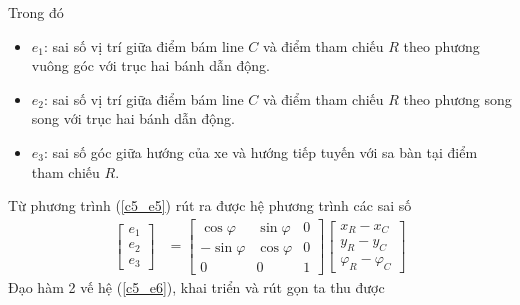           \hspace*{0.6cm}Trong đó
          \begin{itemize}
               \item $e_1$: sai số vị trí giữa điểm bám line $C$ và điểm tham chiếu $R$ theo phương vuông góc với trục hai bánh dẫn động.
               \item $e_2$: sai số vị trí giữa điểm bám line $C$ và điểm tham chiếu $R$ theo phương song song với trục hai bánh dẫn động.
               \item $e_3$: sai số góc giữa hướng của xe và hướng tiếp tuyến với sa bàn tại điểm tham chiếu $R$.
          \end{itemize}    
          \hspace*{0.6cm}Từ phương trình (\ref{c5_e5}) rút ra được hệ phương trình các sai số
          \begin{align}
               \begin{bmatrix}
                    e_1 \\
                    e_2 \\
                    e_3
                    \end{bmatrix} &= \begin{bmatrix}
                    \cos\varphi & \sin \varphi & 0 \\
                    -\sin\varphi & \cos \varphi & 0 \\
                    0 & 0 & 1
                    \end{bmatrix} \begin{bmatrix}
                    x_R - x_C \\
                    y_R - y_C \\
                    \varphi_R - \varphi_C
               \end{bmatrix}
               \label{c5_e6}
          \end{align}
          \hspace*{0.6cm}Đạo hàm 2 vế hệ (\ref{c5_e6}), khai triển và rút gọn ta thu được 
